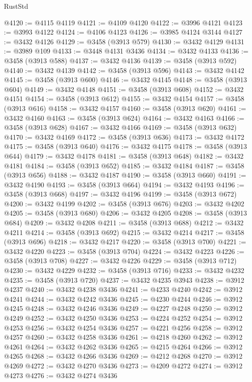 \begin{lexlean}{RustStd}
\begin{coremodule}
@4120 := @4115 @4119
@4121 := @4109 @4120
@4122 := @3996 @4121
@4123 := @3993 @4122
@4124 := @4106 @4123
@4126 := @3985 @4124 @3144
@4127 := @3432 @4126
@4129 := @3458 (@3913 @579)
@4130 := @3432 @4129
@4131 := @3989 @109
@4133 := @3448 @4131 @3436
@4134 := @3432 @4133
@4136 := @3458 (@3913 @588)
@4137 := @3432 @4136
@4139 := @3458 (@3913 @592)
@4140 := @3432 @4139
@4142 := @3458 (@3913 @596)
@4143 := @3432 @4142
@4145 := @3458 (@3913 @600)
@4146 := @3432 @4145
@4148 := @3458 (@3913 @604)
@4149 := @3432 @4148
@4151 := @3458 (@3913 @608)
@4152 := @3432 @4151
@4154 := @3458 (@3913 @612)
@4155 := @3432 @4154
@4157 := @3458 (@3913 @616)
@4158 := @3432 @4157
@4160 := @3458 (@3913 @620)
@4161 := @3432 @4160
@4163 := @3458 (@3913 @624)
@4164 := @3432 @4163
@4166 := @3458 (@3913 @628)
@4167 := @3432 @4166
@4169 := @3458 (@3913 @632)
@4170 := @3432 @4169
@4172 := @3458 (@3913 @636)
@4173 := @3432 @4172
@4175 := @3458 (@3913 @640)
@4176 := @3432 @4175
@4178 := @3458 (@3913 @644)
@4179 := @3432 @4178
@4181 := @3458 (@3913 @648)
@4182 := @3432 @4181
@4184 := @3458 (@3913 @652)
@4185 := @3432 @4184
@4187 := @3458 (@3913 @656)
@4188 := @3432 @4187
@4190 := @3458 (@3913 @660)
@4191 := @3432 @4190
@4193 := @3458 (@3913 @664)
@4194 := @3432 @4193
@4196 := @3458 (@3913 @668)
@4197 := @3432 @4196
@4199 := @3458 (@3913 @672)
@4200 := @3432 @4199
@4202 := @3458 (@3913 @676)
@4203 := @3432 @4202
@4205 := @3458 (@3913 @680)
@4206 := @3432 @4205
@4208 := @3458 (@3913 @684)
@4209 := @3432 @4208
@4211 := @3458 (@3913 @688)
@4212 := @3432 @4211
@4214 := @3458 (@3913 @692)
@4215 := @3432 @4214
@4217 := @3458 (@3913 @696)
@4218 := @3432 @4217
@4220 := @3458 (@3913 @700)
@4221 := @3432 @4220
@4223 := @3458 (@3913 @704)
@4224 := @3432 @4223
@4226 := @3458 (@3913 @708)
@4227 := @3432 @4226
@4229 := @3458 (@3913 @712)
@4230 := @3432 @4229
@4232 := @3458 (@3913 @716)
@4233 := @3432 @4232
@4235 := @3458 (@3913 @720)
@4237 := @3432 @4235 @3943
@4238 := @3912 @4237
@4240 := @3432 @4238 @3436
@4241 := @4233 @4240
@4242 := @3912 @4241
@4244 := @3432 @4242 @3436
@4245 := @4230 @4244
@4246 := @3912 @4245
@4248 := @3432 @4246 @3436
@4249 := @4227 @4248
@4250 := @3912 @4249
@4252 := @3432 @4250 @3436
@4253 := @4224 @4252
@4254 := @3912 @4253
@4256 := @3432 @4254 @3436
@4257 := @4221 @4256
@4258 := @3912 @4257
@4260 := @3432 @4258 @3436
@4261 := @4218 @4260
@4262 := @3912 @4261
@4264 := @3432 @4262 @3436
@4265 := @4215 @4264
@4266 := @3912 @4265
@4268 := @3432 @4266 @3436
@4269 := @4212 @4268
@4270 := @3912 @4269
@4272 := @3432 @4270 @3436
@4273 := @4209 @4272
@4274 := @3912 @4273
@4276 := @3432 @4274 @3436

\end{coremodule}
\end{lexlean}
